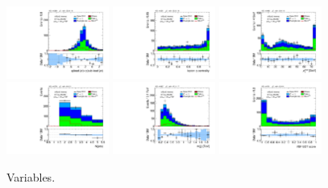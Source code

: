 \begin{figure}[!htpb]
  \includegraphics[width=0.30\textwidth]{figures/analysis/vbf-topCR/jets-etaprod}
  \includegraphics[width=0.30\textwidth]{figures/analysis/vbf-topCR/lep-eta-centrality}
  \includegraphics[width=0.30\textwidth]{figures/analysis/vbf-topCR/system-pt} \\
  \includegraphics[width=0.30\textwidth]{figures/analysis/vbf-topCR/n-jets30}
  \includegraphics[width=0.30\textwidth]{figures/analysis/vbf-topCR/dijet-m-veryhigh}
  \includegraphics[width=0.30\textwidth]{figures/analysis/vbf-topCR/BDTEve-VBF} \\
  \caption{Variables.}
  \label{fig:backgrounds-topCR-jets}
\end{figure}


